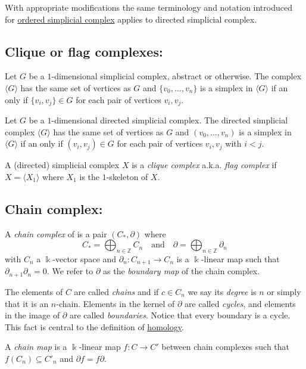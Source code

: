 \documentclass{amsart}
\begin{document}
	With appropriate modifications the same terminology and notation introduced for \hyperref[ordered simplicial complex]{ordered simplicial complex} applies to directed simplicial complex.
	
	\subsection*{Clique or flag complexes:} \label{clique or flag complexes}
	
	Let $G$ be a $1$-dimensional simplicial complex, abstract or otherwise. The complex $\langle G \rangle$ has the same set of vertices as $G$ and $\{v_0, \dots, v_n\}$ is a simplex in $\langle G \rangle$ if an only if $\{v_i, v_j\} \in G$ for each pair of vertices $v_i, v_j$. 
	
	Let $G$ be a $1$-dimensional directed simplicial complex. The directed simplicial complex $\langle G \rangle$ has the same set of vertices as $G$ and $(v_0, \dots, v_n)$ is a simplex in $\langle G \rangle$ if an only if $(v_i, v_j) \in G$ for each pair of vertices $v_i, v_j$ with $i < j$. 
	
	A (directed) simplicial complex $X$ is a \textit{clique complex} a.k.a. \textit{flag complex} if $X = \langle X_1 \rangle$ where $X_1$ is the $1$-skeleton of $X$. 
	
	\subsection*{Chain complex:} \label{chain complex}
	
	A \textit{chain complex} of is a pair $(C_*, \partial)$ where
	\begin{equation*}
	C_* = \bigoplus_{n \in \mathbb Z} C_n \quad \mathrm{and} \quad \partial = \bigoplus_{n \in \mathbb Z} \partial_n
	\end{equation*}
	with  $C_n$ a $\Bbbk$-vector space and $\partial_n : C_{n+1} \to C_n$ is a $\Bbbk$-linear map such that $\partial_{n+1} \partial_n = 0$. We refer to $\partial$ as the \textit{boundary map} of the chain complex.

	The elements of $C$ are called \textit{chains} and if $c \in C_n$ we say its \textit{degree} is $n$ or simply that it is an $n$-chain. Elements in the kernel of $\partial$ are called \textit{cycles}, and elements in the image of $\partial$ are called \textit{boundaries}. Notice that every boundary is a cycle. This fact is central to the definition of \hyperref[homology]{homology}.
	
	A \textit{chain map} is a $\Bbbk$-linear map $f : C \to C'$ between chain complexes such that $f(C_n) \subseteq C'_n$ and $\partial f = f \partial$.
	
\end{document}
